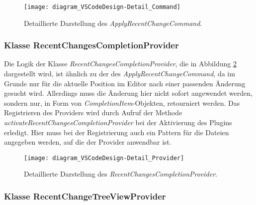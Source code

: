 \begin{figure}
    \centering
    \texttt{[image: diagram\_VSCodeDesign-Detail\_Command]}
    \caption{Detaillierte Darstellung des \emph{ApplyRecentChangeCommand}.}
    \label{fig:diagram_VSCodeDesign-Detail_Command}
\end{figure}   

\subsubsection{Klasse RecentChangesCompletionProvider}

Die Logik der Klasse \emph{RecentChangesCompletionProvider}, 
die in Abbildung \ref{fig:diagram_VSCodeDesign-Detail_Provider} dargestellt wird,
ist ähnlich
zu der des \emph{ApplyRecentChangeCommand}, da im Grunde nur für
die aktuelle Position im Editor nach einer passenden Änderung 
gesucht wird. Allerdings muss die Änderung hier nicht sofort
angewendet werden, sondern nur, in Form von \emph{CompletionItem}-Objekten,
retourniert werden. Das Registrieren des Providers wird durch
Aufruf der Methode \emph{activateRecentChangesCompletionProvider} bei
der Aktivierung des Plugins erledigt. Hier muss bei der Registrierung
auch ein Pattern für die Dateien angegeben werden, auf die der Provider
anwendbar ist.

\begin{figure}
    \centering
    \texttt{[image: diagram\_VSCodeDesign-Detail\_Provider]}
    \caption{Detaillierte Darstellung des \emph{RecentChangesCompletionProvider}.}
    \label{fig:diagram_VSCodeDesign-Detail_Provider}
\end{figure}   

\subsubsection{Klasse RecentChangeTreeViewProvider}

